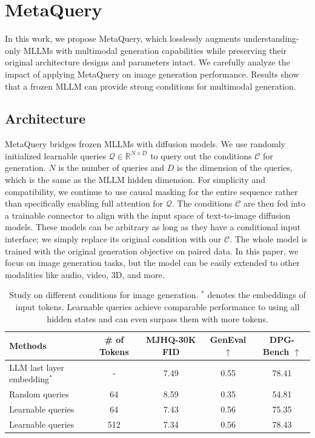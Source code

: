 \documentclass[]{fairmeta}
\newcommand\our{{\fontfamily{lmtt}\selectfont MetaQuery}\xspace}
\begin{document}
\section{\our}
In this work, we propose \our, which losslessly augments understanding-only MLLMs with multimodal generation capabilities while preserving their original architecture designs and parameters intact. We carefully analyze the impact of applying \our on image generation performance. Results show that a frozen MLLM can provide strong conditions for multimodal generation.

\subsection{Architecture}
\our bridges frozen MLLMs with diffusion models. We use randomly initialized learnable queries $\mathcal{Q}\in \mathbb{R}^{N\times D}$ to query out the conditions $\mathcal{C}$ for generation. $N$ is the number of queries and $D$ is the dimension of the queries, which is the same as the MLLM hidden dimension. 
For simplicity and compatibility, we continue to use causal masking for the entire sequence rather than specifically enabling full attention for $\mathcal{Q}$.
The conditions $\mathcal{C}$ are then fed into a trainable connector to align with the input space of text-to-image diffusion models. These models can be arbitrary as long as they have a conditional input interface; we simply replace its original condition with our $\mathcal{C}$. The whole model is trained with the original generation objective on paired data. In this paper, we focus on image generation tasks, but the model can be easily extended to other modalities like audio, video, 3D, and more.


\begin{table}[!t]
    \small
    \centering
    \begin{tabular}{lcccc}
        
        \textbf{Methods} & \textbf{\# of Tokens} & \textbf{MJHQ-30K FID } & \textbf{GenEval $\uparrow$} & \textbf{DPG-Bench $\uparrow$} \\
        \midrule
 LLM last layer embedding$^*$ & - & 7.49 & 0.55 & 78.41 \\
 Random queries & 64 & 8.59 & 0.35 & 54.81 \\
 Learnable queries & 64 & 7.43 & \cellcolor{green!10}0.56 & 75.35 \\
 Learnable queries & 512 & \cellcolor{green!10}7.34 & \cellcolor{green!10}0.56 & \cellcolor{green!10}78.43 \\

    \end{tabular}
    \caption{Study on different conditions for image generation. $^*$ denotes the embeddings of input tokens. Learnable queries achieve comparable performance to using all hidden states and can even surpass them with more tokens.}
    \label{tab:learnable_queries}
\end{table}
\end{document}
